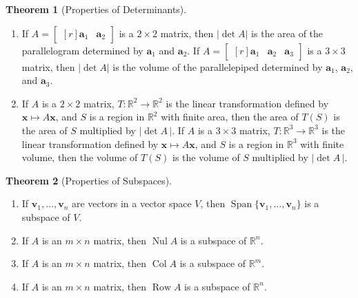 \documentclass{myart}
\renewcommand{\vec}[1]{\ensuremath{\mathbf{#1}}}
\newcommand{\mat}[1]{\ensuremath{#1}}
\newcommand{\R}[1][]{\ensuremath{\mathbb{R}^{#1}}}
\newcommand{\by}{\ensuremath{\times}}
\newcommand{\MAT}[2][r]{\ensuremath{\begin{bmatrix*}[#1]#2\end{bmatrix*}}}
\DeclareMathOperator{\OpSpan}{Span}
\newcommand{\Span}[1]{\ensuremath{\OpSpan\{#1\}}}
\newcommand{\trans}{\ensuremath{^T}}
\DeclareMathOperator{\Nul}{Nul}
\DeclareMathOperator{\Col}{Col}
\DeclareMathOperator{\Row}{Row}
\newcommand{\many}[2][n]{\ensuremath{{#2}_1, \ldots, {#2}_{#1}}}
\theoremstyle{definition}
\newtheorem{thm}{Theorem}
\begin{document}
\begin{thm}[Properties of Determinants]
\begin{enumerate}
\begin{align*}
{                       C_{21} & C_{22} & \cdots & C_{2n} \\
                       \vdots & \vdots & \ddots & \vdots \\
                       C_{n1} & C_{n2} & \cdots & C_{nn}
                     }\trans, \\
           C_{ij} &= (-1)^{i+j}\det \mat A_{ij},
    \end{align*}
    and $\mat A_{ij}$ denotes the matrix obtained by removing row $i$
    and column $j$ from \mat A.
  \item If $\mat A = \MAT{\vec a_1 & \vec a_2}$ is a $2 \by 2$ matrix,
    then $|\det \mat A|$ is the area of the parallelogram determined
    by $\vec a_1$ and $\vec a_2$. If $\mat A = \MAT{\vec a_1 & \vec
      a_2 & \vec a_3}$ is a $3 \by 3$ matrix, then $|\det \mat A|$ is
    the volume of the parallelepiped determined by $\vec a_1$, $\vec
    a_2$, and $\vec a_3$.
  \item If \mat A is a $2 \by 2$ matrix, $T : \R[2] \to \R[2]$ is the
    linear transformation defined by $\vec x \mapsto \mat A\vec x$,
    and $S$ is a region in \R[2] with finite area, then the area of
    $T(S)$ is the area of $S$ multiplied by $|\det \mat A\,|$. If \mat
    A is a $3 \by 3$ matrix, $T : \R[3] \to \R[3]$ is the linear
    transformation defined by $\vec x \mapsto \mat A\vec x$, and $S$
    is a region in \R[3] with finite volume, then the volume of $T(S)$
    is the volume of $S$ multiplied by $|\det \mat A\,|$.
  \end{enumerate}
\end{thm}

\begin{thm}[Properties of Subspaces] \hfill
  \begin{enumerate}
  \item If \many{\vec v} are vectors in a vector space $V$, then
    \Span{\many{\vec v}} is a subspace of $V$.
  \item If \mat A is an $m \by n$ matrix, then $\Nul \mat A$ is a
    subspace of \R[n].
  \item If \mat A is an $m \by n$ matrix, then $\Col \mat A$ is a
    subspace of \R[m].
  \item If \mat A is an $m \by n$ matrix, then $\Row \mat A$ is a
    subspace of \R[n].
  \end{enumerate}
\end{thm}
\end{document}
